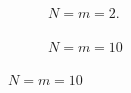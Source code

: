 \documentclass[12pt]{article}
\begin{document}
\begin{figure}
	
	\begin{subfigure}{.47\textwidth}
		\centering
		\caption{\(N=m=2\).}
		\label{fig:NN2}
	\end{subfigure}%
	\quad
	\begin{subfigure}{.47\textwidth}
		\centering
		\caption{\(N=m=10\)}
		\label{fig:NN10}
	\end{subfigure}%
	

\end{figure}
\end{document}

